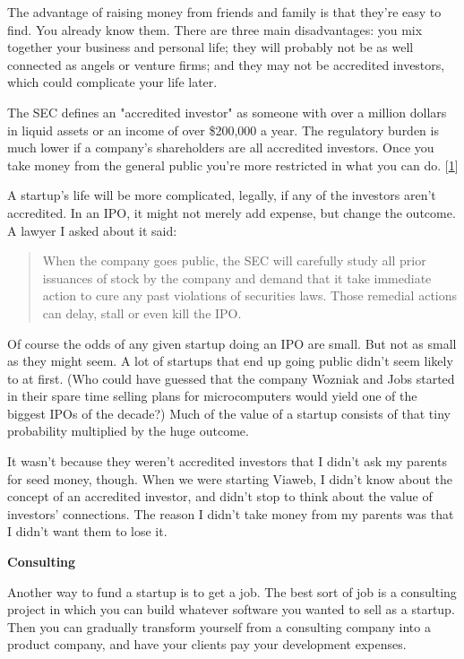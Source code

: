 The advantage of raising money from friends and family is that
they're easy to find.  You already know them.  There are three main
disadvantages: you mix together your business and personal life;
they will probably not be as well connected as angels or venture
firms; and they may not be accredited investors, which could
complicate your life later.

The SEC defines an "accredited investor" as someone with over a
million dollars in liquid assets or an income of over \$200,000 a
year.  The regulatory burden is much lower if a company's shareholders
are all accredited investors.  Once you take money from the general
public you're more restricted in what you can do. 
[\href{\#f1n}{1}]

A startup's life will be more complicated, legally, if any of the
investors aren't accredited.  In an IPO, it might not merely add
expense, but change the outcome. A lawyer I asked about it said:

\begin{quote}

  When the company goes public, the SEC will carefully study all
  prior issuances of stock by the company and demand that it take
  immediate action to cure any past violations of securities laws.
  Those remedial actions can delay, stall or even kill the IPO.

\end{quote}

Of course the odds of any given startup doing an IPO are small.
But not as small as they might seem. A lot of startups that end up
going public didn't seem likely to at first. (Who could have guessed
that the company Wozniak and Jobs started in their spare time selling
plans for microcomputers would yield one of the biggest IPOs of the
decade?) Much of the value of a startup consists of that tiny
probability multiplied by the huge outcome.

It wasn't because they weren't accredited investors that I didn't
ask my parents for seed money, though.  When we were starting Viaweb,
I didn't know about the concept of an accredited investor, and
didn't stop to think about the value of investors' connections.
The reason I didn't take money from my parents was that I didn't
want them to lose it.

\textbf{Consulting}

Another way to fund a startup is to get a job.  The best sort of
job is a consulting project in which you can build whatever software
you wanted to sell as a startup.  Then you can gradually transform
yourself from a consulting company into a product company, and have
your clients pay your development expenses.

